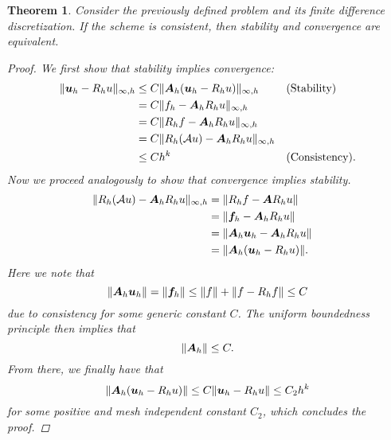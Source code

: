 \documentclass{article}
\renewcommand{\vec}{\vectorsym}
\newcommand{\mat}{\matrixsym}
\newtheorem{theorem}{Theorem}
\begin{document}
\begin{theorem}
    Consider the previously defined problem and its finite difference discretization. If the scheme is consistent, then stability and convergence are equivalent. 
    \begin{proof}
        We first show that stability implies convergence:
        \begin{align*}
            \| \vec u_h - R_h u\|_{\infty,h} &\leq C\|\mat A_h(\vec u_h - R_hu) \|_{\infty,h} && \text{(Stability)} \\
                                             &=C \| f_h - \mat A_hR_h u \|_{\infty,h} && \\
                                             &=C \| R_h f - \mat A_hR_h u\|_{\infty,h} &&\\
                                             &=C \|R_h(\mathcal A u) - \mat A_hR_h u\|_{\infty,h}&& \\
                                             &\leq Ch^k && \text{(Consistency)}. 
        \end{align*}
        Now we proceed analogously to show that convergence implies stability.
        \begin{align*}
            \|R_h(\mathcal Au) - \mat A_h R_h u\|_{\infty,h} &= \|R_h f- \mat AR_h u \| && \\
                    &= \|\vec f_h - \mat A_hR_hu \| \\
                    &= \| \mat A_h \vec u_h - \mat A_h R_h u \| \\
                    &= \| \mat A_h(\vec u_h - R_h u) \|.
        \end{align*}
        Here we note that 
        $$ \| \mat A_h\vec u_h \| = \| \vec f_h \| \leq \| f\| + \|f - R_h f\| \leq C $$
        due to consistency for some generic constant $C$. The uniform boundedness principle then implies that
        $$ \| \mat A_h \| \leq C. $$
        From there, we finally have that
        $$ \| \mat A_h(\vec u_h - R_h u) \| \leq C \|\vec u_h - R_h u\| \leq C_2 h^k$$
        for some positive and mesh independent constant $C_2$, which concludes the proof. 
    \end{proof}
\end{theorem}
\end{document}
